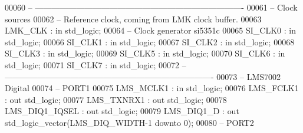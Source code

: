 \begin{DoxyCode}
00060 \textcolor{keyword}{      -- ----------------------------------------------------------------------------}
00061 \textcolor{keyword}{      -- Clock sources}
00062 \textcolor{keyword}{         -- Reference clock, coming from LMK clock buffer.}
00063       \textcolor{vhdlchar}{LMK_CLK}           \textcolor{vhdlchar}{:} \textcolor{keywordflow}{in}     \textcolor{comment}{std\_logic};
00064 \textcolor{keyword}{         -- Clock generator si5351c}
00065       \textcolor{vhdlchar}{SI_CLK0}           \textcolor{vhdlchar}{:} \textcolor{keywordflow}{in}     \textcolor{comment}{std\_logic};
00066       \textcolor{vhdlchar}{SI_CLK1}           \textcolor{vhdlchar}{:} \textcolor{keywordflow}{in}     \textcolor{comment}{std\_logic};
00067       \textcolor{vhdlchar}{SI_CLK2}           \textcolor{vhdlchar}{:} \textcolor{keywordflow}{in}     \textcolor{comment}{std\_logic};
00068       \textcolor{vhdlchar}{SI_CLK3}           \textcolor{vhdlchar}{:} \textcolor{keywordflow}{in}     \textcolor{comment}{std\_logic};
00069       \textcolor{vhdlchar}{SI_CLK5}           \textcolor{vhdlchar}{:} \textcolor{keywordflow}{in}     \textcolor{comment}{std\_logic};
00070       \textcolor{vhdlchar}{SI_CLK6}           \textcolor{vhdlchar}{:} \textcolor{keywordflow}{in}     \textcolor{comment}{std\_logic};
00071       \textcolor{vhdlchar}{SI_CLK7}           \textcolor{vhdlchar}{:} \textcolor{keywordflow}{in}     \textcolor{comment}{std\_logic};
00072 \textcolor{keyword}{      -- ----------------------------------------------------------------------------}
00073 \textcolor{keyword}{      -- LMS7002 Digital}
00074 \textcolor{keyword}{         -- PORT1}
00075       \textcolor{vhdlchar}{LMS_MCLK1}         \textcolor{vhdlchar}{:} \textcolor{keywordflow}{in}     \textcolor{comment}{std\_logic};
00076       \textcolor{vhdlchar}{LMS_FCLK1}         \textcolor{vhdlchar}{:} \textcolor{keywordflow}{out}    \textcolor{comment}{std\_logic};
00077       \textcolor{vhdlchar}{LMS_TXNRX1}        \textcolor{vhdlchar}{:} \textcolor{keywordflow}{out}    \textcolor{comment}{std\_logic};
00078       \textcolor{vhdlchar}{LMS_DIQ1_IQSEL}    \textcolor{vhdlchar}{:} \textcolor{keywordflow}{out}    \textcolor{comment}{std\_logic};
00079       \textcolor{vhdlchar}{LMS_DIQ1_D}        \textcolor{vhdlchar}{:} \textcolor{keywordflow}{out}    \textcolor{comment}{std\_logic\_vector}\textcolor{vhdlchar}{(}\textcolor{vhdlchar}{LMS_DIQ_WIDTH}\textcolor{vhdlchar}{-}\textcolor{vhdllogic}{}\textcolor{vhdllogic}{1} \textcolor{keywordflow}{downto} \textcolor{vhdllogic}{}\textcolor{vhdllogic}{0}\textcolor{vhdlchar}{)};
00080 \textcolor{keyword}{         -- PORT2}

\end{DoxyCode}
